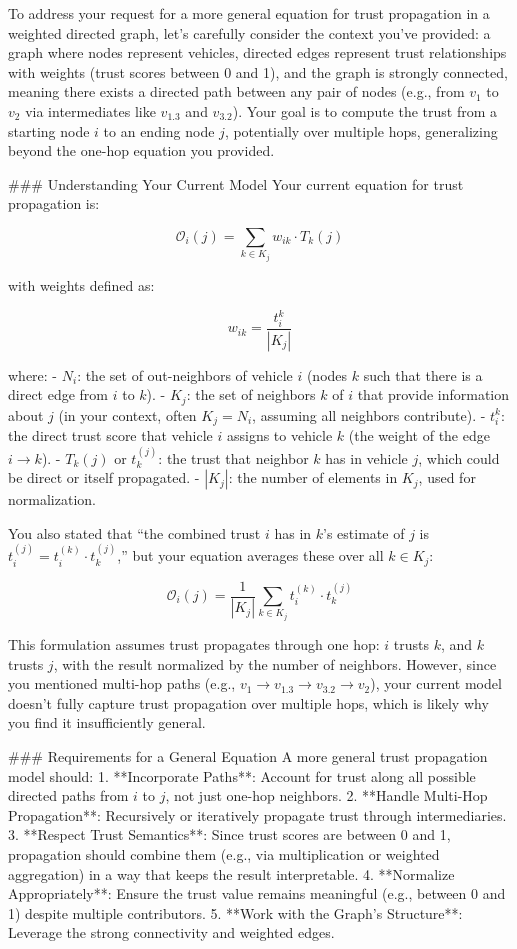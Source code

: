 \documentclass{article}
\begin{document}
To address your request for a more general equation for trust propagation in a weighted directed graph, let’s carefully consider the context you’ve provided: a graph where nodes represent vehicles, directed edges represent trust relationships with weights (trust scores between 0 and 1), and the graph is strongly connected, meaning there exists a directed path between any pair of nodes (e.g., from \( v_1 \) to \( v_2 \) via intermediates like \( v_{1.3} \) and \( v_{3.2} \)). Your goal is to compute the trust from a starting node \( i \) to an ending node \( j \), potentially over multiple hops, generalizing beyond the one-hop equation you provided.

### Understanding Your Current Model
Your current equation for trust propagation is:

\[ \mathcal{O}_i(j) = \sum_{k \in K_j} w_{ik} \cdot T_k(j) \]

with weights defined as:

\[ w_{ik} = \frac{t_i^k}{|K_j|} \]

where:
- \( N_i \): the set of out-neighbors of vehicle \( i \) (nodes \( k \) such that there is a direct edge from \( i \) to \( k \)).
- \( K_j \): the set of neighbors \( k \) of \( i \) that provide information about \( j \) (in your context, often \( K_j = N_i \), assuming all neighbors contribute).
- \( t_i^k \): the direct trust score that vehicle \( i \) assigns to vehicle \( k \) (the weight of the edge \( i \to k \)).
- \( T_k(j) \) or \( t_k^{(j)} \): the trust that neighbor \( k \) has in vehicle \( j \), which could be direct or itself propagated.
- \( |K_j| \): the number of elements in \( K_j \), used for normalization.

You also stated that “the combined trust \( i \) has in \( k \)’s estimate of \( j \) is \( t_i^{(j)} = t_i^{(k)} \cdot t_k^{(j)} \),” but your equation averages these over all \( k \in K_j \):

\[ \mathcal{O}_i(j) = \frac{1}{|K_j|} \sum_{k \in K_j} t_i^{(k)} \cdot t_k^{(j)} \]

This formulation assumes trust propagates through one hop: \( i \) trusts \( k \), and \( k \) trusts \( j \), with the result normalized by the number of neighbors. However, since you mentioned multi-hop paths (e.g., \( v_1 \to v_{1.3} \to v_{3.2} \to v_2 \)), your current model doesn’t fully capture trust propagation over multiple hops, which is likely why you find it insufficiently general.

### Requirements for a General Equation
A more general trust propagation model should:
1. **Incorporate Paths**: Account for trust along all possible directed paths from \( i \) to \( j \), not just one-hop neighbors.
2. **Handle Multi-Hop Propagation**: Recursively or iteratively propagate trust through intermediaries.
3. **Respect Trust Semantics**: Since trust scores are between 0 and 1, propagation should combine them (e.g., via multiplication or weighted aggregation) in a way that keeps the result interpretable.
4. **Normalize Appropriately**: Ensure the trust value remains meaningful (e.g., between 0 and 1) despite multiple contributors.
5. **Work with the Graph’s Structure**: Leverage the strong connectivity and weighted edges.
\end{document}
